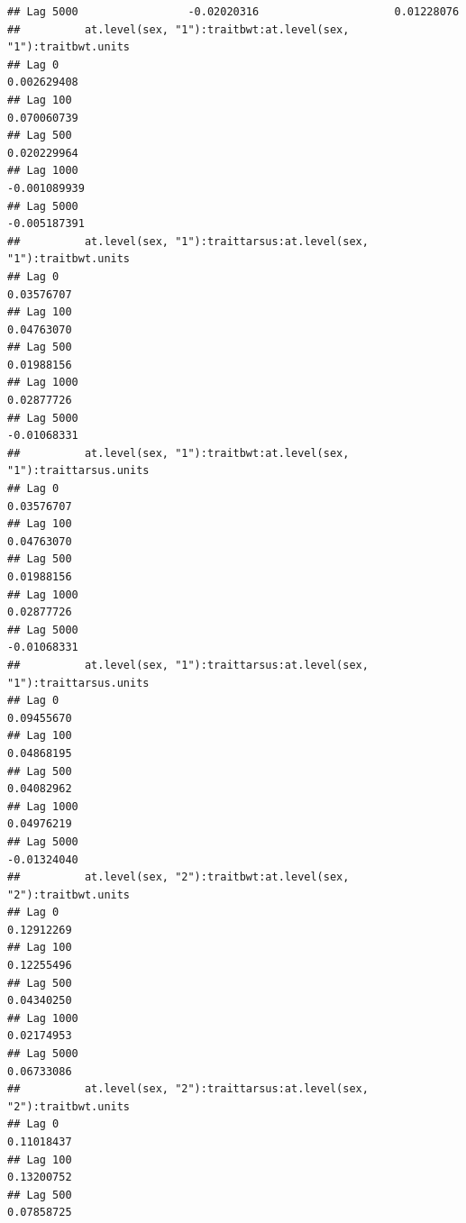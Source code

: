 \documentclass[
  12pt,
]{book}
\begin{document}
\begin{verbatim}
## Lag 5000                 -0.02020316                     0.01228076
##          at.level(sex, "1"):traitbwt:at.level(sex, "1"):traitbwt.units
## Lag 0                                                      0.002629408
## Lag 100                                                    0.070060739
## Lag 500                                                    0.020229964
## Lag 1000                                                  -0.001089939
## Lag 5000                                                  -0.005187391
##          at.level(sex, "1"):traittarsus:at.level(sex, "1"):traitbwt.units
## Lag 0                                                          0.03576707
## Lag 100                                                        0.04763070
## Lag 500                                                        0.01988156
## Lag 1000                                                       0.02877726
## Lag 5000                                                      -0.01068331
##          at.level(sex, "1"):traitbwt:at.level(sex, "1"):traittarsus.units
## Lag 0                                                          0.03576707
## Lag 100                                                        0.04763070
## Lag 500                                                        0.01988156
## Lag 1000                                                       0.02877726
## Lag 5000                                                      -0.01068331
##          at.level(sex, "1"):traittarsus:at.level(sex, "1"):traittarsus.units
## Lag 0                                                             0.09455670
## Lag 100                                                           0.04868195
## Lag 500                                                           0.04082962
## Lag 1000                                                          0.04976219
## Lag 5000                                                         -0.01324040
##          at.level(sex, "2"):traitbwt:at.level(sex, "2"):traitbwt.units
## Lag 0                                                       0.12912269
## Lag 100                                                     0.12255496
## Lag 500                                                     0.04340250
## Lag 1000                                                    0.02174953
## Lag 5000                                                    0.06733086
##          at.level(sex, "2"):traittarsus:at.level(sex, "2"):traitbwt.units
## Lag 0                                                          0.11018437
## Lag 100                                                        0.13200752
## Lag 500                                                        0.07858725

\end{verbatim}
\end{document}
